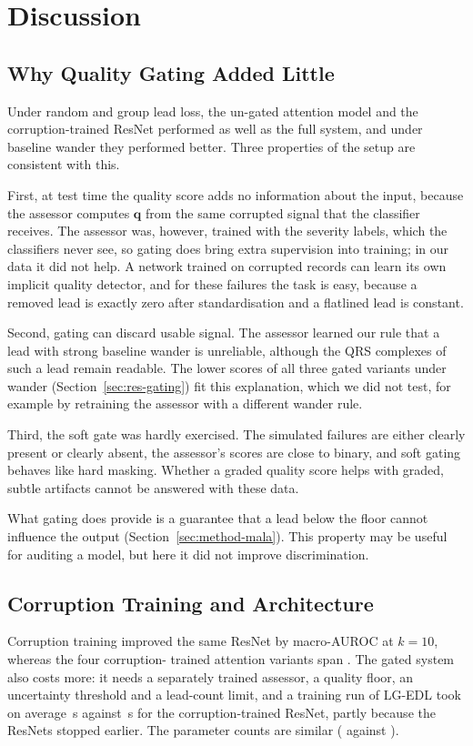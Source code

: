 \section{Discussion}
\label{sec:discussion}

\subsection{Why Quality Gating Added Little}
Under random and group lead loss, the un-gated attention model and the corruption-trained ResNet performed as well
as the full system, and under baseline wander they performed better. Three properties of the setup are consistent
with this.

First, at test time the quality score adds no information about the input, because the assessor computes
$\mathbf{q}$ from the same corrupted signal that the classifier receives. The assessor was, however, trained with the
severity labels, which the classifiers never see, so gating does bring extra supervision into training; in our data
it did not help. A network trained on corrupted records can learn its own implicit quality detector, and for these
failures the task is easy, because a removed lead is exactly zero after standardisation and a flatlined lead is
constant.

Second, gating can discard usable signal. The assessor learned our rule that a lead with strong baseline wander is
unreliable, although the QRS complexes of such a lead remain readable. The lower scores of all three gated variants
under wander (Section~\ref{sec:res-gating}) fit this explanation, which we did not test, for example by retraining
the assessor with a different wander rule.

Third, the soft gate was hardly exercised. The simulated failures are either clearly present or clearly absent, the
assessor's scores are close to binary, and soft gating behaves like hard masking. Whether a graded quality score
helps with graded, subtle artifacts cannot be answered with these data.

What gating does provide is a guarantee that a lead below the floor cannot influence the output
(Section~\ref{sec:method-mala}). This property may be useful for auditing a model, but here it did not improve
discrimination.

\subsection{Corruption Training and Architecture}
Corruption training improved the same ResNet by \gainDropKTen{} macro-AUROC at $k=10$, whereas the four corruption-
trained attention variants span \ablRangeKTen. The gated system also costs more: it needs a separately trained
assessor, a quality floor, an uncertainty threshold and a lead-count limit, and a training run of LG-EDL took on
average \secLgEdlRun{}\,s against \secResDropRun{}\,s for the corruption-trained ResNet, partly because the ResNets
stopped earlier. The parameter counts are similar (\paramsLgEdl{} against \paramsRes).

